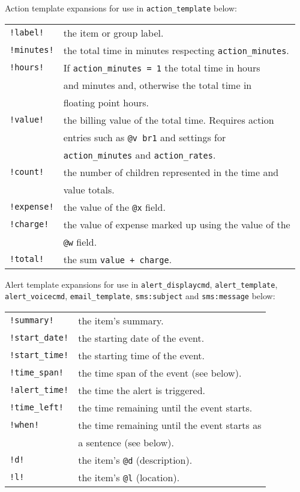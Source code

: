 \documentclass[9pt,landscape]{article}
\begin{document}
\begin{multicols}{3}
Action template expansions for use in \verb!action_template! below:

\begin{tabular}{@{}ll@{}}
\verb'!label!' & the item or group label. \\
\verb'!minutes!' &  the total time in minutes respecting \verb!action_minutes!. \\
\verb'!hours!' & If \verb!action_minutes = 1! the total time in hours \\
               & and minutes and, otherwise the total time in \\
               & floating point hours. \\
\verb'!value!' & the billing value of the total time. Requires action \\
               & entries such as \verb!@v br1! and settings  for  \\
               & \verb!action_minutes! and \verb!action_rates!. \\
\verb'!count!' & the number of children represented in the time and \\
               & value totals. \\
\verb'!expense!' & the value of the \verb!@x! field. \\
\verb'!charge!' & the value of expense marked up using the value of the\\
& \verb!@w! field. \\
\verb'!total!' & the sum \verb!value + charge!. \\

\end{tabular}


Alert template expansions for use in \verb!alert_displaycmd!, \verb'alert_template', \verb!alert_voicecmd!, \verb!email_template!, \verb'sms:subject' and \verb'sms:message' below:

\begin{tabular}{@{}ll@{}}
\verb'!summary!'      & the item's summary. \\
\verb'!start_date!'   & the starting date of the event. \\
\verb'!start_time!'   & the starting time of the event. \\
\verb'!time_span!'    & the time span of the event (see below). \\
\verb'!alert_time!'   & the time the alert is triggered. \\
\verb'!time_left!'    & the time remaining until the event starts. \\
\verb'!when!'         & the time remaining until the event starts as \\
                        & a sentence (see below). \\
\verb'!d!'            & the item's \verb!@d! (description). \\
\verb'!l!'            & the item's \verb!@l! (location). \\
\end{tabular}


\end{multicols}
\end{document}
